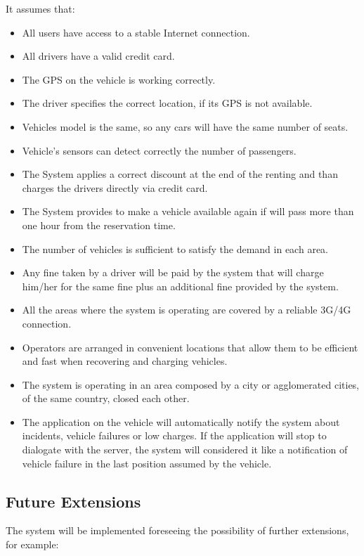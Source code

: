 It assumes that:
\begin{itemize}
	\item All users have access to a stable Internet connection.
	\item All drivers have a valid credit card.
	\item The GPS on the vehicle is working correctly.
	\item The driver specifies the correct location, if its GPS is not available.
	\item Vehicles model is the same, so any cars will have the same number of seats.
	\item Vehicle's sensors can detect correctly the number of passengers.
	\item The System applies a correct discount at the end of the renting and than charges the drivers directly via credit card.
	\item The System provides to make a vehicle available again if will pass more than one hour from the reservation time.
	\item The number of vehicles is sufficient to satisfy the demand in each area.
	\item Any fine taken by a driver will be paid by the system that will charge him/her for the same fine plus an additional fine provided by the system.
	\item All the areas where the system is operating are covered by a reliable 3G/4G connection.
	\item Operators are arranged in convenient locations that allow them to be efficient and fast when recovering and charging vehicles.
	\item The system is operating in an area composed by a city or agglomerated cities, of the same country, closed each other.
	\item The application on the vehicle will automatically notify the system about incidents, vehicle failures or low charges. If the application will stop to dialogate with the server, the system will considered it like a notification of vehicle failure in the last position assumed by the vehicle.
\end{itemize}

\subsection{Future Extensions}
The system will be implemented foreseeing the possibility of further extensions, for example:

